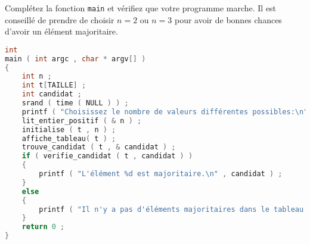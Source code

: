\question Complétez la fonction \texttt{main} et vérifiez que votre programme marche. Il est conseillé de prendre de choisir \(n=2\) ou \(n=3\) pour avoir de bonnes chances d'avoir un élément majoritaire.

\begin{solutioncachee}
  \begin{lstlisting}[language=C]
int 
main ( int argc , char * argv[] )
{
    int n ;
    int t[TAILLE] ;
    int candidat ;
    srand ( time ( NULL ) ) ;
    printf ( "Choisissez le nombre de valeurs différentes possibles:\n" ) ;
    lit_entier_positif ( & n ) ;
    initialise ( t , n ) ;
    affiche_tableau( t ) ;
    trouve_candidat ( t , & candidat ) ;
    if ( verifie_candidat ( t , candidat ) )
    {
        printf ( "L'élément %d est majoritaire.\n" , candidat ) ;
    }
    else
    {
        printf ( "Il n'y a pas d'éléments majoritaires dans le tableau.\n") ;
    }
    return 0 ;
}
  \end{lstlisting}
\end{solutioncachee}




